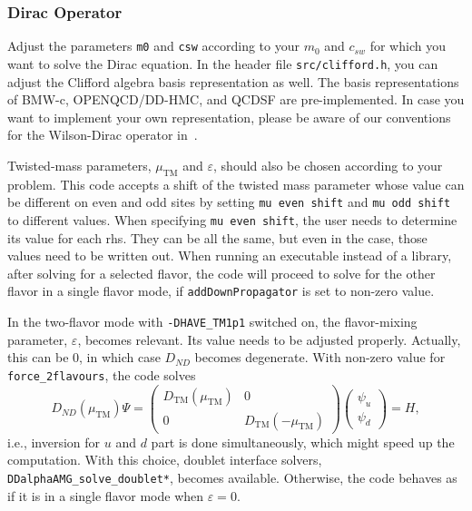 \documentclass[a4paper,12pt]{scrartcl}
\begin{document}
\subsubsection{Dirac Operator}\label{dirac_op:ss}
Adjust the parameters \texttt{m0} and \texttt{csw} according to your $m_0$ and $c_{sw}$ for which you want to solve the Dirac equation. In the header file \texttt{src/clifford.h}, you can adjust the Clifford algebra basis representation as well. The basis representations of BMW-c, OPENQCD/DD-HMC, and QCDSF are pre-implemented.  In case you want to implement your own representation, please be aware of our conventions for the Wilson-Dirac operator in~\cite{FroKaKrLeRo13,RottmannPhD}.

Twisted-mass parameters, $\mu_\mathrm{TM}$ and $\varepsilon$, should also be chosen according to your problem.  This code accepts a shift of the twisted mass parameter whose value can be different on even and odd sites by setting \texttt{mu even shift} and \texttt{mu odd shift} to different values.  When specifying \texttt{mu even shift}, the user needs to determine its value for each rhs.  They can be all the same, but even in the case, those values need to be written out.  When running an executable instead of a library, after solving for a selected flavor, the code will proceed to solve for the other flavor in a single flavor mode, if \texttt{addDownPropagator} is set to non-zero value.

In the two-flavor mode with \texttt{-DHAVE\_TM1p1} switched on, the flavor-mixing parameter, $\varepsilon$, becomes relevant.  Its value needs to be adjusted properly.  Actually, this can be 0, in which case $D_{ND}$ becomes degenerate.  With non-zero value for \texttt{force\_2flavours}, the code solves
\begin{equation*}
D_{ND}(\mu_\mathrm{TM}) \Psi
=
\begin{pmatrix}
D_{\mathrm{TM}}(\mu_\mathrm{TM}) & 0\\
0 & D_{\mathrm{TM}}(-\mu_\mathrm{TM})
\end{pmatrix}
\begin{pmatrix}
\psi_u\\
\psi_d
\end{pmatrix} = H,
\end{equation*}
i.e., inversion for $u$ and $d$ part is done simultaneously, which might speed up the computation.  With this choice, doublet interface solvers, \texttt{DDalphaAMG\_solve\_doublet*}, becomes available.  Otherwise, the code behaves as if it is in a single flavor mode when $\varepsilon=0$.
\end{document}
